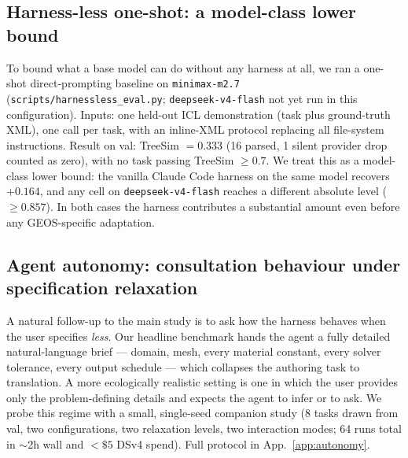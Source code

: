 \documentclass{article}
\begin{document}
\subsection{Harness-less one-shot: a model-class lower bound}
\label{subsec:harnessless}

To bound what a base model can do without any harness at all, we ran a one-shot direct-prompting baseline on \texttt{minimax-m2.7} (\texttt{scripts/harnessless\_eval.py}; \texttt{deepseek-v4-flash} not yet run in this configuration). Inputs: one held-out ICL demonstration (task plus ground-truth XML), one call per task, with an inline-XML protocol replacing all file-system instructions. Result on val: TreeSim $= 0.333$ (16 parsed, 1 silent provider drop counted as zero), with no task passing TreeSim $\geq 0.7$. We treat this as a model-class lower bound: the vanilla Claude Code harness on the same model recovers ${+}0.164$, and any cell on \texttt{deepseek-v4-flash} reaches a different absolute level ($\geq 0.857$). In both cases the harness contributes a substantial amount even before any GEOS-specific adaptation.

\subsection{Agent autonomy: consultation behaviour under specification relaxation}
\label{subsec:autonomy}

A natural follow-up to the main study is to ask how the harness behaves when the user specifies \emph{less}. Our headline benchmark hands the agent a fully detailed natural-language brief --- domain, mesh, every material constant, every solver tolerance, every output schedule --- which collapses the authoring task to translation. A more ecologically realistic setting is one in which the user provides only the problem-defining details and expects the agent to infer or to ask. We probe this regime with a small, single-seed companion study (8 tasks drawn from val, two configurations, two relaxation levels, two interaction modes; 64 runs total in $\sim$2h wall and ${<}\$5$ DSv4 spend). Full protocol in App.~\ref{app:autonomy}.
\end{document}

